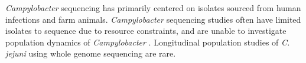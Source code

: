 \documentclass[letterpaper,titlepage,12pt]{article}
\begin{document}
\textit{Campylobacter} sequencing has primarily centered on isolates sourced from human infections and farm animals. \textit{Campylobacter} sequencing studies often have limited isolates to sequence due to resource constraints, and are unable to investigate population dynamics of \textit{Campylobacter} \parencite{cantero2018characterization, whitehouse2018use, clark2016genomic, kovanen2014multilocus}. Longitudinal population studies of \textit{C. jejuni} using whole genome sequencing are rare. 








\end{document}

